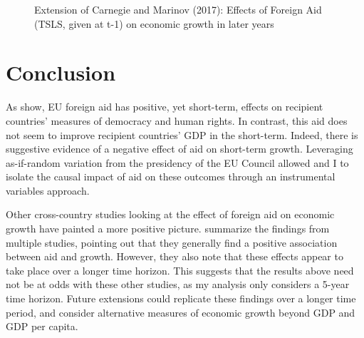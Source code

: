 \documentclass[12pt, ]{article}
\newenvironment{CSLReferences}[2]{

\clearpage
}{}
\begin{document}
\begin{figure}
\begin{minipage}[t]{0.50\linewidth}
{{}

}

\end{minipage}%

\caption{\label{fig-extension}Extension of Carnegie and Marinov (2017):
Effects of Foreign Aid (TSLS, given at t-1) on economic growth in later
years}

\end{figure}

\hypertarget{conclusion}{%
\section{Conclusion}\label{conclusion}}

As \citet{carnegie2017foreign} show, EU foreign aid has positive, yet
short-term, effects on recipient countries' measures of democracy and
human rights. In contrast, this aid does not seem to improve recipient
countries' GDP in the short-term. Indeed, there is suggestive evidence
of a negative effect of aid on short-term growth. Leveraging
as-if-random variation from the presidency of the EU Council allowed
\citet{carnegie2017foreign} and I to isolate the causal impact of aid on
these outcomes through an instrumental variables approach.

Other cross-country studies looking at the effect of foreign aid on
economic growth have painted a more positive picture.
\citet{arndt2015what} summarize the findings from multiple studies,
pointing out that they generally find a positive association between aid
and growth. However, they also note that these effects appear to take
place over a longer time horizon. This suggests that the results above
need not be at odds with these other studies, as my analysis only
considers a 5-year time horizon. Future extensions could replicate these
findings over a longer time period, and consider alternative measures of
economic growth beyond GDP and GDP per capita.

\hypertarget{refs}{}

\begin{CSLReferences}{0}{0}\end{CSLReferences}


\end{document}
